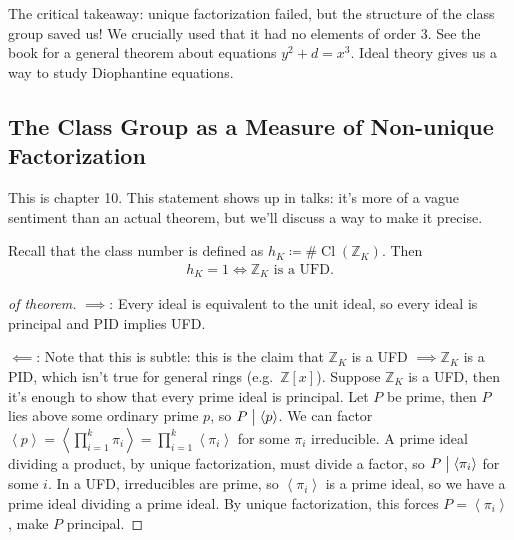 \begin{remark}

The critical takeaway: unique factorization failed, but the structure of
the class group saved us! We crucially used that it had no elements of
order 3. See the book for a general theorem about equations
\(y^2 + d = x^3\). Ideal theory gives us a way to study Diophantine
equations.

\end{remark}

\hypertarget{the-class-group-as-a-measure-of-non-unique-factorization}{%
\subsection{The Class Group as a Measure of Non-unique
Factorization}\label{the-class-group-as-a-measure-of-non-unique-factorization}}

\begin{remark}

This is chapter 10. This statement shows up in talks: it's more of a
vague sentiment than an actual theorem, but we'll discuss a way to make
it precise.

\end{remark}

\begin{theorem}

Recall that the class number is defined as
\(h_K \coloneqq\# { \operatorname{Cl}} ({\mathbb{Z}}_K)\). Then
\begin{align*}
h_K = 1 \iff {\mathbb{Z}}_K \text{ is a UFD}
.\end{align*}

\end{theorem}

\begin{proof}[of theorem]

\(\implies\): Every ideal is equivalent to the unit ideal, so every
ideal is principal and PID implies UFD.

\hfill\break

\(\impliedby\): Note that this is subtle: this is the claim that
\({\mathbb{Z}}_K\) is a UFD \(\implies {\mathbb{Z}}_K\) is a PID, which
isn't true for general rings (e.g.~\({\mathbb{Z}}[x]\)). Suppose
\({\mathbb{Z}}_K\) is a UFD, then it's enough to show that every prime
ideal is principal. Let \(P\) be prime, then \(P\) lies above some
ordinary prime \(p\), so \(P \bigm|\left\langle{ p }\right\rangle\). We
can factor
\(\left\langle{ p }\right\rangle= \left\langle{ \prod_{i=1}^k \pi_i }\right\rangle = \prod_{i=1}^k \left\langle{ \pi_i }\right\rangle\)
for some \(\pi_i\) irreducible. A prime ideal dividing a product, by
unique factorization, must divide a factor, so
\(P \bigm|\left\langle{ \pi_i }\right\rangle\) for some \(i\). In a UFD,
irreducibles are prime, so \(\left\langle{ \pi_i }\right\rangle\) is a
prime ideal, so we have a prime ideal dividing a prime ideal. By unique
factorization, this forces \(P = \left\langle{ \pi_i }\right\rangle\),
make \(P\) principal.

\end{proof}


